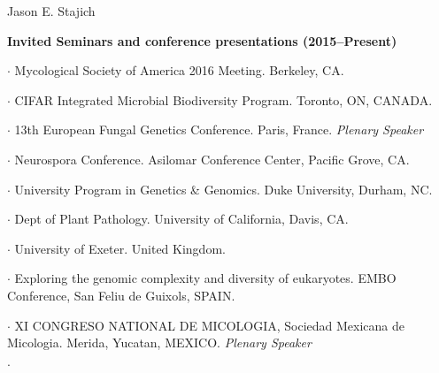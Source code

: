 \documentclass[10pt]{article}
\begin{document}
\begin{cv}{\centerline{Jason E. Stajich}}
\begin{cvlistcompact}{\bf Invited Seminars and conference presentations (2015--Present)}
\item [2016] $\cdot$
  Mycological Society of America 2016 Meeting. Berkeley, CA. 
\item $\cdot$
    CIFAR Integrated Microbial Biodiversity Program. Toronto, ON, CANADA.
  \item $\cdot$   %
    13th European Fungal Genetics Conference.
    Paris, France.  {\it Plenary Speaker}
  \item $\cdot$ %
    Neurospora Conference. Asilomar Conference Center, Pacific
    Grove, CA.
  \item $\cdot$ %
    University Program in Genetics \& Genomics. Duke University, Durham, NC. 
  \item $\cdot$ %
    Dept of Plant Pathology. University of California, Davis,
    CA. 
  \item $\cdot$ %
    University of Exeter. United Kingdom.   
\item [2015] $\cdot$ %
  Exploring the genomic complexity and diversity of
  eukaryotes. EMBO Conference, San Feliu de Guixols, SPAIN. 
\item $\cdot$   %
  XI CONGRESO NATIONAL DE MICOLOGIA, Sociedad Mexicana de
  Micologia. Merida, Yucatan, MEXICO. {\it Plenary Speaker}
  \item $\cdot$ %

\end{cvlistcompact}
\end{cv}
\end{document}

